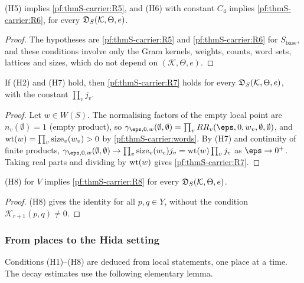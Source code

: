 \begin{lemma}\label{pf:thmS-carrier:liftblock}
(H5) implies \ref{pf:thmS-carrier:R5}, and (H6) with constant $C_4$ implies \ref{pf:thmS-carrier:R6}, for every
$\mathfrak{D}_S(\mathcal K,\Theta,e)$.
\end{lemma}

\begin{proof}
The hypotheses are \ref{pf:thmS-carrier:R5} and \ref{pf:thmS-carrier:R6} for $S_{\mathrm{base}}$, and these conditions involve
only the Gram kernels, weights, counts, word sets, lattices and sizes, which do not depend on $(\mathcal K,\Theta,e)$.
\end{proof}

\begin{lemma}\label{pf:thmS-carrier:levelzero}
If (H2) and (H7) hold, then \ref{pf:thmS-carrier:R7} holds for every $\mathfrak{D}_S(\mathcal K,\Theta,e)$, with the
constant $\prod_vj_v$.
\end{lemma}

\begin{proof}
Let $w\in W(S)$. The normalising factors of the empty local point are $n_v(\emptyset)=1$ (empty product), so
$\gamma_{\eps,0,w}(\emptyset,\emptyset)=\prod_vRR_v(\eps,0,w_v,\emptyset,\emptyset)$, and
$\operatorname{wt}(w)=\prod_v\mathrm{size}_v(w_v)>0$ by \cref{pf:thmS-carrier:words}. By (H7) and continuity of finite products,
$\gamma_{\eps,0,w}(\emptyset,\emptyset)\to\prod_v\mathrm{size}_v(w_v)j_v=\thmScarrierWt(w)\prod_vj_v$ as $\eps\to0^+$. Taking
real parts and dividing by $\operatorname{wt}(w)$ gives \ref{pf:thmS-carrier:R7}.
\end{proof}

\begin{lemma}\label{pf:thmS-carrier:cutoff}
(H8) for $V$ implies \ref{pf:thmS-carrier:R8} for every $\mathfrak{D}_S(\mathcal K,\Theta,e)$.
\end{lemma}

\begin{proof}
(H8) gives the identity for all $p,q\in Y$, without the condition $\mathcal K_{r+1}(p,q)\ne0$.
\end{proof}

\subsubsection{From places to the Hida setting}
Conditions (H1)--(H8) are deduced from local statements, one place at a time. The decay estimates use the following
elementary lemma.

